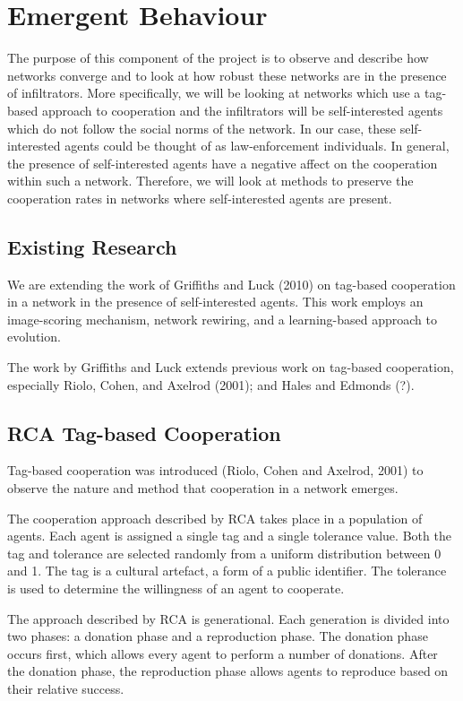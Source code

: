 \section{Emergent Behaviour}

The purpose of this component of the project is to observe and
describe how networks converge and to look at how robust these
networks are in the presence of infiltrators.  More specifically,
we will be looking at networks which use a tag-based approach to
cooperation and the infiltrators will be self-interested agents
which do not follow the social norms of the network.  In our case,
these self-interested agents could be thought of as law-enforcement
individuals.  In general, the presence of self-interested agents
have a negative affect on the cooperation within such a network.
Therefore, we will look at methods to preserve the cooperation rates
in networks where self-interested agents are present.

\subsection{Existing Research}

We are extending the work of Griffiths and Luck (2010) on tag-based
cooperation in a network in the presence of self-interested agents.
This work employs an image-scoring mechanism, network rewiring, and
a learning-based approach to evolution.

The work by Griffiths and Luck extends previous work on tag-based
cooperation, especially Riolo, Cohen, and Axelrod (2001); and Hales
and Edmonds (?).

\subsection{RCA Tag-based Cooperation}

Tag-based cooperation was introduced (Riolo, Cohen and Axelrod,
2001) to observe the nature and method that cooperation in a network
emerges.

The cooperation approach described by RCA takes place in a population
of agents.  Each agent is assigned a single tag and a single tolerance
value.  Both the tag and tolerance are selected randomly from a
uniform distribution between 0 and 1.
The tag is a cultural artefact, a form of a public identifier.
The tolerance is used to determine the willingness of an agent to cooperate.

The approach described by RCA is generational.  Each generation is
divided into two phases: a donation phase and a reproduction phase.
The donation phase occurs first, which allows every agent to perform
a number of donations.  After the donation phase, the reproduction
phase allows agents to reproduce based on their relative success.

